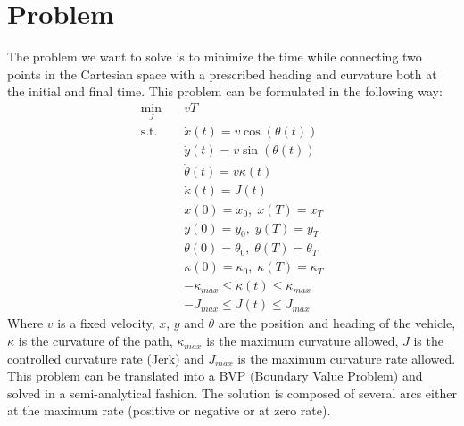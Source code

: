 \documentclass[11pt,twocolumn]{scrartcl}
\begin{document}
\section*{Problem}
%
The problem we want to solve is to minimize the time while connecting two points in the Cartesian space with a prescribed heading and curvature both at the initial and final time. This problem can be formulated in the following way:
%
\begin{equation}
  \begin{split}
    \min_{J} \quad & v T \\ 
    \text{s.t.} \quad
      &\dot{x}(t)      = v \cos(\theta(t)) \\
      &\dot{y}(t)      = v \sin(\theta(t)) \\
      &\dot{\theta}(t) = v \kappa(t)       \\
      &\dot{\kappa}(t) = J(t)              \\
      &x(0)      = x_0,      \; x(T)      = x_T     \\
      &y(0)      = y_0,      \; y(T)      = y_T     \\
      &\theta(0) = \theta_0, \; \theta(T) = \theta_T\\
      &\kappa(0) = \kappa_0, \; \kappa(T) = \kappa_T\\
      &-\kappa_{max} \le \kappa(t) \le \kappa_{max} \\
      &-J_{max} \le J(t) \le J_{max}
  \end{split}
\end{equation}
%
Where $v$ is a fixed velocity, $x$, $y$ and $\theta$ are the position and heading of the vehicle, $\kappa$ is the curvature of the path, $\kappa_{max}$ is the maximum curvature allowed, $J$ is the controlled curvature rate (Jerk) and $J_{max}$ is the maximum curvature rate allowed.\\
%
This problem can be translated into a BVP (Boundary Value Problem) and solved in a semi-analytical fashion. The solution is composed of several arcs either at the maximum rate (positive or negative or at zero rate). 
%
\end{document}
